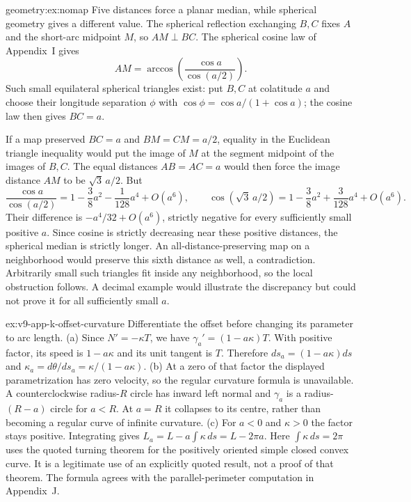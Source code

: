 \begin{solution}{geometry:ex:nomap}
\idea Five distances force a planar median, while spherical geometry gives a different value.
\writeup The spherical reflection exchanging $B,C$ fixes $A$ and the short-arc midpoint $M$, so $AM\perp BC$. The spherical cosine law of Appendix~I gives
\[
AM=\arccos\left(\frac{\cos a}{\cos(a/2)}\right).
\]
Such small equilateral spherical triangles exist: put $B,C$ at colatitude $a$ and choose their longitude separation $\phi$ with $\cos\phi=\cos a/(1+\cos a)$; the cosine law then gives $BC=a$.

If a map preserved $BC=a$ and $BM=CM=a/2$, equality in the Euclidean triangle inequality would put the image of $M$ at the segment midpoint of the images of $B,C$. The equal distances $AB=AC=a$ would then force the image distance $AM$ to be $\sqrt3\,a/2$. But
\[
\frac{\cos a}{\cos(a/2)}
=1-\frac38a^2-\frac1{128}a^4+O(a^6),\qquad
\cos(\sqrt3\,a/2)
=1-\frac38a^2+\frac3{128}a^4+O(a^6).
\]
Their difference is $-a^4/32+O(a^6)$, strictly negative for every sufficiently small positive $a$. Since cosine is strictly decreasing near these positive distances, the spherical median is strictly longer. An all-distance-preserving map on a neighborhood would preserve this sixth distance as well, a contradiction. Arbitrarily small such triangles fit inside any neighborhood, so the local obstruction follows. A decimal example would illustrate the discrepancy but could not prove it for all sufficiently small $a$.
\end{solution}

\begin{solution}{ex:v9-app-k-offset-curvature}
\idea Differentiate the offset before changing its parameter to arc length.
\writeup (a) Since $N'=-\kappa T$, we have $\gamma_a'=(1-a\kappa)T$. With positive factor, its speed is $1-a\kappa$ and its unit tangent is $T$. Therefore $ds_a=(1-a\kappa)ds$ and
$\kappa_a=d\theta/ds_a=\kappa/(1-a\kappa)$.
(b) At a zero of that factor the displayed parametrization has zero velocity, so the regular curvature formula is unavailable. A counterclockwise radius-$R$ circle has inward left normal and $\gamma_a$ is a radius-$(R-a)$ circle for $a<R$. At $a=R$ it collapses to its centre, rather than becoming a regular curve of infinite curvature.
(c) For $a<0$ and $\kappa>0$ the factor stays positive. Integrating gives $L_a=L-a\int\kappa\,ds=L-2\pi a$. Here $\int\kappa\,ds=2\pi$ uses the quoted turning theorem for the positively oriented simple closed convex curve. It is a legitimate use of an explicitly quoted result, not a proof of that theorem. The formula agrees with the parallel-perimeter computation in Appendix~J.
\end{solution}

